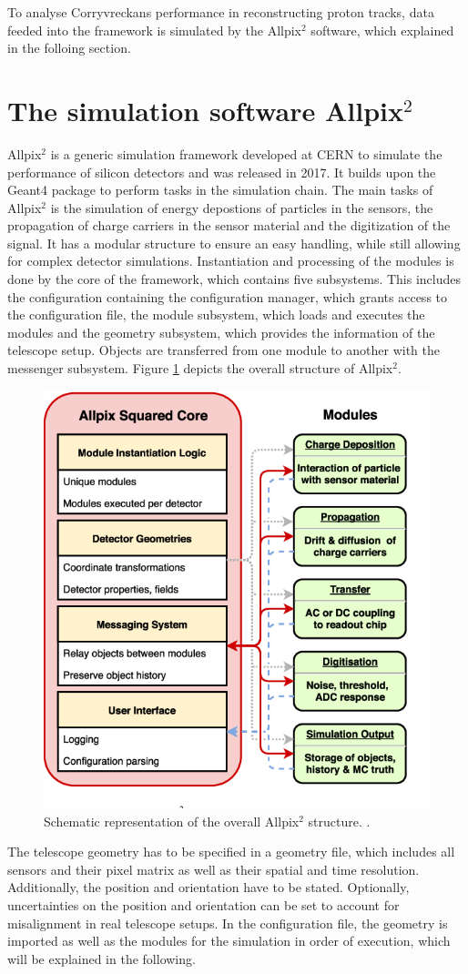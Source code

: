 To analyse Corryvreckans performance in reconstructing proton tracks, data feeded into the framework is simulated by the Allpix$^2$ software,
which explained in the folloing section.

\section{The simulation software Allpix$^2$}
Allpix$^2$ is a generic simulation framework developed at CERN to simulate the performance of silicon detectors and was released in 2017.
It builds upon the
Geant4 \cite{geant4} package to perform tasks in the simulation chain. The main tasks of Allpix$^2$ is the simulation of energy depostions of particles
in the sensors, the propagation of charge carriers in the sensor material and the digitization of the signal. It has a modular
structure to ensure an easy handling, while still allowing for complex detector simulations.
Instantiation and processing of the modules is done by the core of the framework,
which contains five subsystems. This includes the configuration containing the configuration manager, which grants access to the configuration file, the
module subsystem, which loads and executes the modules and the geometry subsystem, which provides the information of the telescope setup.
Objects are transferred from one module to another with the messenger subsystem.
Figure \ref{fig:allpix} depicts the overall structure of Allpix$^2$.

\begin{figure}
  \centering
  \includegraphics[height=0.5\textwidth]{images/allpix.png}
  \caption{Schematic representation of the overall Allpix$^2$ structure. \cite{fig_allpix}.}
  \label{fig:allpix}
\end{figure}

The telescope geometry has to be specified in a geometry file, which includes all sensors and their pixel matrix as well as their spatial and time
resolution. Additionally,
the position and orientation have to be stated. Optionally, uncertainties on the position and orientation can be set to account for misalignment in real
telescope setups.
In the configuration file, the geometry is imported as well as the modules for the simulation in order of execution, which
will be explained in the following.

